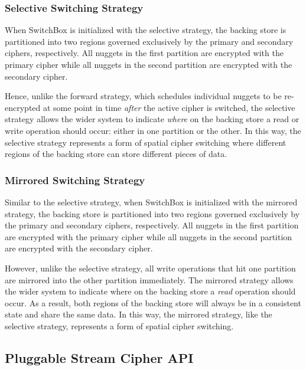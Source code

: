 \subsubsection{Selective Switching Strategy}

When SwitchBox is initialized with the selective strategy, the backing store is
partitioned into two regions governed exclusively by the primary and secondary
ciphers, respectively. All nuggets in the first partition are encrypted with the
primary cipher while all nuggets in the second partition are encrypted with the
secondary cipher.

Hence, unlike the forward strategy, which schedules individual nuggets to be
re-encrypted at some point in time \emph{after} the active cipher is switched,
the selective strategy allows the wider system to indicate \emph{where} on the
backing store a read or write operation should occur: either in one partition or
the other. In this way, the selective strategy represents a form of spatial
cipher switching where different regions of the backing store can store
different pieces of data.

\subsubsection{Mirrored Switching Strategy}

Similar to the selective strategy, when SwitchBox is initialized with the
mirrored strategy, the backing store is partitioned into two regions governed
exclusively by the primary and secondary ciphers, respectively. All nuggets in
the first partition are encrypted with the primary cipher while all nuggets in
the second partition are encrypted with the secondary cipher.

However, unlike the selective strategy, all write operations that hit one
partition are mirrored into the other partition immediately. The mirrored
strategy allows the wider system to indicate where on the backing store a
\emph{read} operation should occur. As a result, both regions of the backing
store will always be in a consistent state and share the same data. In this way,
the mirrored strategy, like the selective strategy, represents a form of spatial
cipher switching.

\subsection{Pluggable Stream Cipher API}

